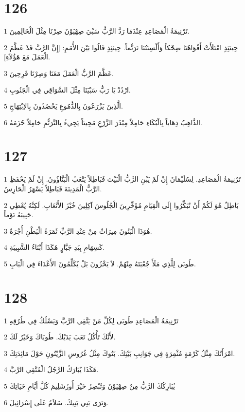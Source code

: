 \chapter{126}

\par 1 تَرْنِيمَةُ الْمَصَاعِدِ عِنْدَمَا رَدَّ الرَّبُّ سَبْيَ صِهْيَوْنَ صِرْنَا مِثْلَ الْحَالِمِينَ.
\par 2 حِينَئِذٍ امْتَلَأَتْ أَفْوَاهُنَا ضِحْكاً وَأَلْسِنَتُنَا تَرَنُّماً. حِينَئِذٍ قَالُوا بَيْنَ الأُمَمِ: [إِنَّ الرَّبَّ قَدْ عَظَّمَ الْعَمَلَ مَعَ هَؤُلاَءِ].
\par 3 عَظَّمَ الرَّبُّ الْعَمَلَ مَعَنَا وَصِرْنَا فَرِحِينَ.
\par 4 ارْدُدْ يَا رَبُّ سَبْيَنَا مِثْلَ السَّوَاقِي فِي الْجَنُوبِ.
\par 5 الَّذِينَ يَزْرَعُونَ بِالدُّمُوعِ يَحْصُدُونَ بِالاِبْتِهَاجِ.
\par 6 الذَّاهِبُ ذِهَاباً بِالْبُكَاءِ حَامِلاً مِبْذَرَ الزَّرْعِ مَجِيئاً يَجِيءُ بِالتَّرَنُّمِ حَامِلاً حُزَمَهُ.

\chapter{127}

\par 1 تَرْنِيمَةُ الْمَصَاعِدِ. لِسُلَيْمَانَ إِنْ لَمْ يَبْنِ الرَّبُّ الْبَيْتَ فَبَاطِلاً يَتْعَبُ الْبَنَّاؤُونَ. إِنْ لَمْ يَحْفَظِ الرَّبُّ الْمَدِينَةَ فَبَاطِلاً يَسْهَرُ الْحَارِسُ.
\par 2 بَاطِلٌ هُوَ لَكُمْ أَنْ تُبَكِّرُوا إِلَى الْقِيَامِ مُؤَخِّرِينَ الْجُلُوسَ آكِلِينَ خُبْزَ الأَتْعَابِ. لَكِنَّهُ يُعْطِي حَبِيبَهُ نَوْماً.
\par 3 هُوَذَا الْبَنُونَ مِيرَاثٌ مِنْ عِنْدِ الرَّبِّ ثَمَرَةُ الْبَطْنِ أُجْرَةٌ.
\par 4 كَسِهَامٍ بِيَدِ جَبَّارٍ هَكَذَا أَبْنَاءُ الشَّبِيبَةِ.
\par 5 طُوبَى لِلَّذِي مَلَأَ جُعْبَتَهُ مِنْهُمْ. لاَ يَخْزُونَ بَلْ يُكَلِّمُونَ الأَعْدَاءَ فِي الْبَابِ.

\chapter{128}

\par 1 تَرْنِيمَةُ الْمَصَاعِدِ طُوبَى لِكُلِّ مَنْ يَتَّقِي الرَّبَّ وَيَسْلُكُ فِي طُرُقِهِ
\par 2 لأَنَّكَ تَأْكُلُ تَعَبَ يَدَيْكَ. طُوبَاكَ وَخَيْرٌ لَكَ.
\par 3 امْرَأَتُكَ مِثْلُ كَرْمَةٍ مُثْمِرَةٍ فِي جَوَانِبِ بَيْتِكَ. بَنُوكَ مِثْلُ غُرُوسِ الزَّيْتُونِ حَوْلَ مَائِدَتِكَ.
\par 4 هَكَذَا يُبَارَكُ الرَّجُلُ الْمُتَّقِي الرَّبَّ.
\par 5 يُبَارِكُكَ الرَّبُّ مِنْ صِهْيَوْنَ وَتُبْصِرُ خَيْرَ أُورُشَلِيمَ كُلَّ أَيَّامِ حَيَاتِكَ
\par 6 وَتَرَى بَنِي بَنِيكَ. سَلاَمٌ عَلَى إِسْرَائِيلَ.

